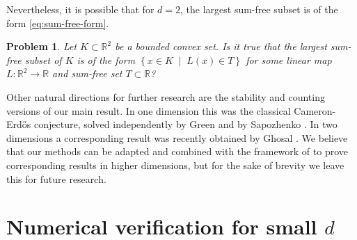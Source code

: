 \documentclass{article}
\newcommand{\setcond}[2]{\left\{ #1 \;\middle\vert\; #2 \right\}}
\newcommand{\RR}{\mathbb{R}}
\newtheorem{prob}[thm]{Problem}
\theoremstyle{definition}
\begin{document}
Nevertheless, it is possible that for $d=2$, the largest sum-free subset is of the form \eqref{eq:sum-free-form}.

\begin{prob}
Let $K\subset \RR^2$ be a bounded convex set. Is it true that the largest sum-free subset of $K$ is of the form $\setcond{x\in K}{L(x)\in T}$ for some linear map $L:\RR^2\to \RR$ and sum-free set $T\subset \RR$?
\end{prob}

Other natural directions for further research are the stability and counting versions of our main result. In one dimension this was the classical Cameron-Erd\H{o}s  \cite{cameron1990number} conjecture, solved independently by Green \cite{green2004cameron} and by Sapozhenko \cite{sapozhenko2008cameron}. In two dimensions a corresponding result was recently obtained by Ghosal \cite{ghosal2025number}. We believe that our methods can be adapted and combined with the framework of \cite{ghosal2025number} to prove corresponding results in higher dimensions, but for the sake of brevity we leave this for future research.




\newpage
\appendix

\section{Numerical verification for small \texorpdfstring{$d$}{d}} \label{sec:numerical}
\end{document}

